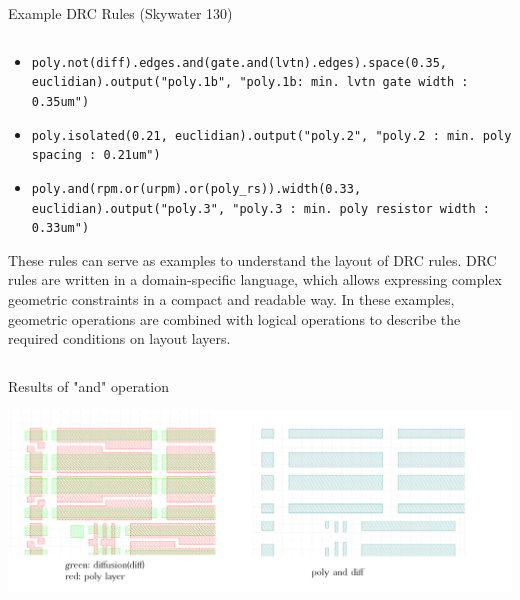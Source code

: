 \documentclass[aspectratio=169]{beamer} %
\begin{document}
\begin{frame}{Example DRC Rules (Skywater 130)}
    \begin{columns}[T]
        \begin{column}{1.0\textwidth}
            \begin{itemize}
                \item \texttt{poly.not(diff).edges.and(gate.and(lvtn).edges).space(0.35, euclidian).output("poly.1b", "poly.1b: min. lvtn gate width : 0.35um")}
                \item \texttt{poly.isolated(0.21, euclidian).output("poly.2", "poly.2 : min. poly spacing : 0.21um")}
                \item \texttt{poly.and(rpm.or(urpm).or(poly\_rs)).width(0.33, euclidian).output("poly.3", "poly.3 : min. poly resistor width : 0.33um")}
            \end{itemize}
            These rules can serve as examples to understand the layout of DRC rules. DRC rules are written in a domain-specific language, which allows expressing complex geometric constraints in a compact and readable way. In these examples, geometric operations are combined with logical operations to describe the required conditions on layout layers.
        \end{column}
    \end{columns}
\end{frame}


\begin{frame}{Results of "and" operation}
    \begin{center}
        \includegraphics[width=\textwidth,height=0.8\textheight,keepaspectratio]{and.png}
    \end{center}
\end{frame}
\end{document}
